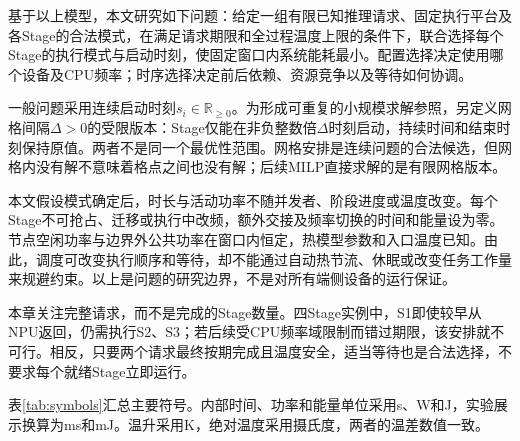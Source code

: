 基于以上模型，本文研究如下问题：给定一组有限已知推理请求、固定执行平台及各Stage的合法模式，在满足请求期限和全过程温度上限的条件下，联合选择每个Stage的执行模式与启动时刻，使固定窗口内系统能耗最小。配置选择决定使用哪个设备及CPU频率；时序选择决定前后依赖、资源竞争以及等待如何协调。

一般问题采用连续启动时刻\(s_i\in\mathbb R_{\ge0}\)。为形成可重复的小规模求解参照，另定义网格间隔\(\Delta>0\)的受限版本：Stage仅能在非负整数倍\(\Delta\)时刻启动，持续时间和结束时刻保持原值。两者不是同一个最优性范围。网格安排是连续问题的合法候选，但网格内没有解不意味着格点之间也没有解；后续MILP直接求解的是有限网格版本。

本文假设模式确定后，时长与活动功率不随并发者、阶段进度或温度改变。每个Stage不可抢占、迁移或执行中改频，额外交接及频率切换的时间和能量设为零。节点空闲功率与边界外公共功率在窗口内恒定，热模型参数和入口温度已知。由此，调度可改变执行顺序和等待，却不能通过自动热节流、休眠或改变任务工作量来规避约束。以上是问题的研究边界，不是对所有端侧设备的运行保证。

本章关注完整请求，而不是完成的Stage数量。四Stage实例中，S1即使较早从NPU返回，仍需执行S2、S3；若后续受CPU频率域限制而错过期限，该安排就不可行。相反，只要两个请求最终按期完成且温度安全，适当等待也是合法选择，不要求每个就绪Stage立即运行。

表\ref{tab:symbols}汇总主要符号。内部时间、功率和能量单位采用s、W和J，实验展示换算为ms和mJ。温升采用K，绝对温度采用摄氏度，两者的温差数值一致。

